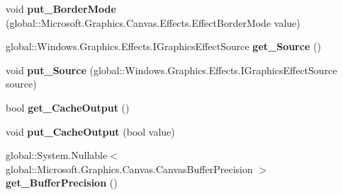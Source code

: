 \begin{DoxyCompactItemize}
\item 
\mbox{\label{class_microsoft_1_1_graphics_1_1_canvas_1_1_effects_1_1_directional_blur_effect_acdd57b5d08067ae3121bdbefa68e50b8}} 
void {\bfseries put\+\_\+\+Border\+Mode} (global\+::\+Microsoft.\+Graphics.\+Canvas.\+Effects.\+Effect\+Border\+Mode value)
\item 
\mbox{\label{class_microsoft_1_1_graphics_1_1_canvas_1_1_effects_1_1_directional_blur_effect_aef24cab3895c1c8498616466fcb52a51}} 
global\+::\+Windows.\+Graphics.\+Effects.\+I\+Graphics\+Effect\+Source {\bfseries get\+\_\+\+Source} ()
\item 
\mbox{\label{class_microsoft_1_1_graphics_1_1_canvas_1_1_effects_1_1_directional_blur_effect_aa034111bc667082df708438e58b6ae46}} 
void {\bfseries put\+\_\+\+Source} (global\+::\+Windows.\+Graphics.\+Effects.\+I\+Graphics\+Effect\+Source source)
\item 
\mbox{\label{class_microsoft_1_1_graphics_1_1_canvas_1_1_effects_1_1_directional_blur_effect_a5138db2da9de6fc0292de9196ca4ad04}} 
bool {\bfseries get\+\_\+\+Cache\+Output} ()
\item 
\mbox{\label{class_microsoft_1_1_graphics_1_1_canvas_1_1_effects_1_1_directional_blur_effect_ad0ff3191c7cf5af3adb8552dceb94c61}} 
void {\bfseries put\+\_\+\+Cache\+Output} (bool value)
\item 
\mbox{\label{class_microsoft_1_1_graphics_1_1_canvas_1_1_effects_1_1_directional_blur_effect_a4405c8306c5c98a67fcc220ae5ad8ae6}} 
global\+::\+System.\+Nullable$<$ global\+::\+Microsoft.\+Graphics.\+Canvas.\+Canvas\+Buffer\+Precision $>$ {\bfseries get\+\_\+\+Buffer\+Precision} ()
\item 
\mbox{\label{class_microsoft_1_1_graphics_1_1_canvas_1_1_effects_1_1_directional_blur_effect_abbe97a33ad8aa36a850bc56189985a1a}} 

\end{DoxyCompactItemize}
